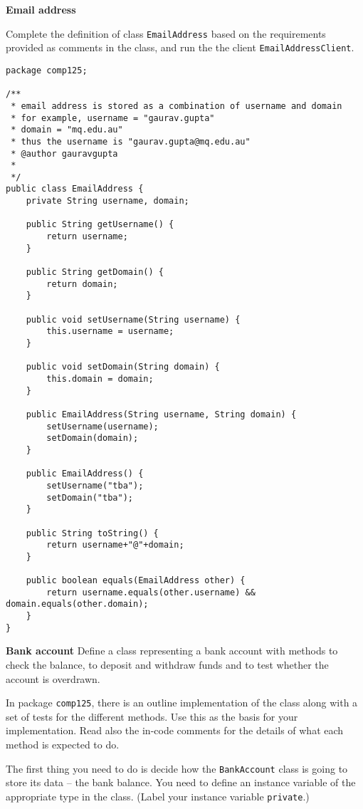 \begin{questions}

\question  \textbf{Email address} \vskip 0.5cm

Complete the definition of class \texttt{EmailAddress} based on the requirements provided as comments in the class, and run the the client \texttt{EmailAddressClient}.

\begin{solution}
\begin{lstlisting}
package comp125;

/**
 * email address is stored as a combination of username and domain
 * for example, username = "gaurav.gupta"
 * domain = "mq.edu.au"
 * thus the username is "gaurav.gupta@mq.edu.au"
 * @author gauravgupta
 *
 */
public class EmailAddress {
	private String username, domain;

	public String getUsername() {
		return username;
	}

	public String getDomain() {
		return domain;
	}

	public void setUsername(String username) {
		this.username = username;
	}

	public void setDomain(String domain) {
		this.domain = domain;
	}

	public EmailAddress(String username, String domain) {
		setUsername(username);
		setDomain(domain);
	}
	
	public EmailAddress() {
		setUsername("tba");
		setDomain("tba");
	}

	public String toString() {
		return username+"@"+domain;
	}
	
	public boolean equals(EmailAddress other) {
		return username.equals(other.username) && domain.equals(other.domain);
	}
}
\end{lstlisting}
\end{solution}

\question  \textbf{Bank account} \vskip 0.5cm
Define a class representing a bank account with methods to check the balance, to deposit and withdraw funds and to test whether the account is overdrawn.

In package \texttt{comp125}, there is an outline implementation of the class along with a set of tests for the different methods. Use this as the basis for your implementation. Read also the in-code comments for the details of what each method is expected to do.

The first thing you need to do is decide how the \texttt{BankAccount} class is going to store its data -- the bank balance. You need to define an instance variable of the appropriate type in the class. (Label your instance variable \texttt{private}.)


\end{questions}
